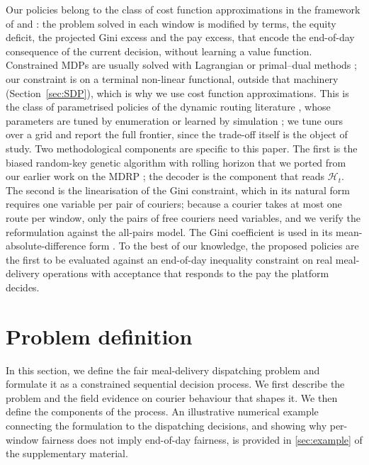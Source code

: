 \documentclass[a4paper,11pt,review,3p,authoryear]{elsarticle}
\newcommand{\Hist}{\mathcal{H}}
\begin{document}
Our policies belong to the class of cost function approximations in the framework of \cite{powell2021reinforcement} and \cite{POWELL2019795}: the problem solved in each window is modified by terms, the equity deficit, the projected Gini excess and the pay excess, that encode the end-of-day consequence of the current decision, without learning a value function. Constrained MDPs are usually solved with Lagrangian or primal--dual methods \citep{altman1999constrained,borkar2005actor}; our constraint is on a terminal non-linear functional, outside that machinery (Section~\ref{sec:SDP}), which is why we use cost function approximations. This is the class of parametrised policies of the dynamic routing literature \citep{SOEFFKER2022801}, whose parameters are tuned by enumeration or learned by simulation \citep{stein2024learning}; we tune ours over a grid and report the full frontier, since the trade-off itself is the object of study. Two methodological components are specific to this paper. The first is the biased random-key genetic algorithm \citep{goncalves2011biased} with rolling horizon that we ported from our earlier work on the MDRP \citep{giraldo2024grasp,giraldo2026brkga}; the decoder is the component that reads $\Hist_t$. The second is the linearisation of the Gini constraint, which in its natural form requires one variable per pair of couriers; because a courier takes at most one route per window, only the pairs of free couriers need variables, and we verify the reformulation against the all-pairs model. The Gini coefficient is used in its mean-absolute-difference form \citep{yitzhaki1979relative}. To the best of our knowledge, the proposed policies are the first to be evaluated against an end-of-day inequality constraint on real meal-delivery operations with acceptance that responds to the pay the platform decides.

\section{Problem definition}
\label{sec:problem_definition}

In this section, we define the fair meal-delivery dispatching problem and formulate it as a constrained sequential decision process. We first describe the problem and the field evidence on courier behaviour that shapes it. We then define the components of the process. An illustrative numerical example connecting the formulation to the dispatching decisions, and showing why per-window fairness does not imply end-of-day fairness, is provided in \ref{sec:example} of the supplementary material.
\end{document}
